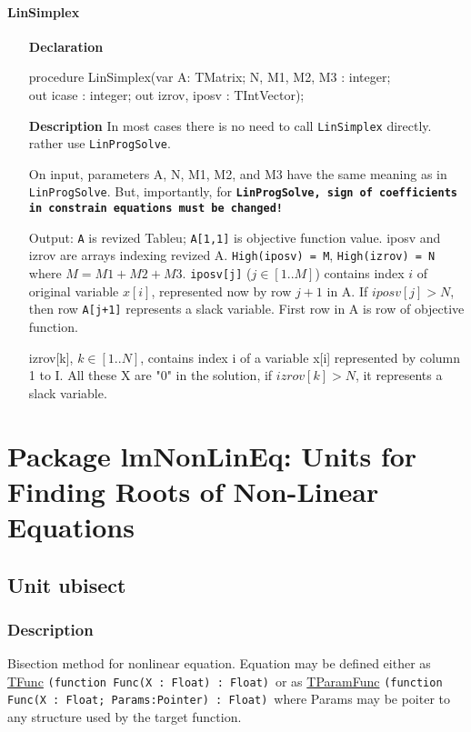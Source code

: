 \documentclass[12pt,a4paper,oneside]{report}
\newcommand{\declarationitem}[1]{\textbf{#1}}
\newcommand{\descriptiontitle}[1]{\textbf{#1}}
\newcommand{\code}[1]{\texttt{#1}}
\begin{document}
\subsubsection{LinSimplex}
\label{ulinsimplex:linsimplex}
\begin{itemize}
	\item[\declarationitem{Declaration}\hfill]
	\begin{flushleft}
	procedure LinSimplex(var  A: TMatrix; N, M1, M2, M3 : integer; \\ \hspace{12pt}out icase : integer; out izrov, iposv : TIntVector);
	\end{flushleft}
	\item[\descriptiontitle{Description}\hfill]
	In most cases there is no need to call \code{LinSimplex} directly. rather use \code{LinProgSolve}. 
	
	On input, parameters A, N, M1, M2, and M3 have the same meaning as in \code{LinProgSolve}. But, importantly, for \textbf\code{LinProgSolve, {sign of coefficients in constrain equations must be changed!}} 
	
	Output: \code{A} is revized Tableu;  \code{A[1,1]} is objective function value. iposv and izrov are arrays indexing revized A. \code{High(iposv) = M}, \code{High(izrov) = N} where $ M = M1 + M2 + M3$.
	\code{iposv[j]} ($j \in [1..M]$) contains index $i$ of original variable $x[i]$, represented now by row $j+1$ in A. If $iposv[j] > N$, then row \code{A[j+1]} represents a slack variable.
	First row in A is row of objective function.
	
	izrov[k], $k \in [1..N]$, contains index i of a variable x[i] represented by column 1 to I.
	All these X are "0" in the solution, if $izrov[k] > N$, it represents a slack variable.
\end{itemize}


\chapter[Package lmNonLinEq]{Package lmNonLinEq: Units for Finding Roots of Non-Linear Equations}\label{package-lmNonLinEq}
\section{Unit ubisect}
\label{ubisect}
\subsection{Description}
Bisection method for nonlinear equation. Equation may be defined either as \hyperref[utypes-TFunc]{TFunc} \code{(function Func(X : Float) : Float)}\ or as \hyperref[utypes-TParamFunc]{TParamFunc} \code{(function Func(X : Float; Params:Pointer) : Float)}\ where Params may be poiter to any structure used by the target function.  
\end{document}

